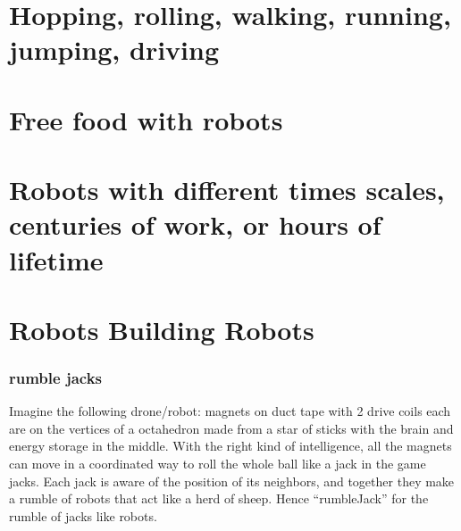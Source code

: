 \section{Hopping, rolling, walking, running, jumping,
driving}\label{hopping-rolling-walking-running-jumping-driving}

\section{Free food with robots}\label{free-food-with-robots}

\section{Robots with different times scales, centuries of work, or hours
of
lifetime}\label{robots-with-different-times-scales-centuries-of-work-or-hours-of-lifetime}

\section{Robots Building Robots}\label{robots-building-robots}

\subsubsection{rumble jacks}\label{rumble-jacks}

Imagine the following drone/robot: magnets on duct tape with 2 drive
coils each are on the vertices of a octahedron made from a star of
sticks with the brain and energy storage in the middle. With the right
kind of intelligence, all the magnets can move in a coordinated way to
roll the whole ball like a jack in the game jacks. Each jack is aware of
the position of its neighbors, and together they make a rumble of robots
that act like a herd of sheep. Hence ``rumbleJack'' for the rumble of
jacks like robots.

